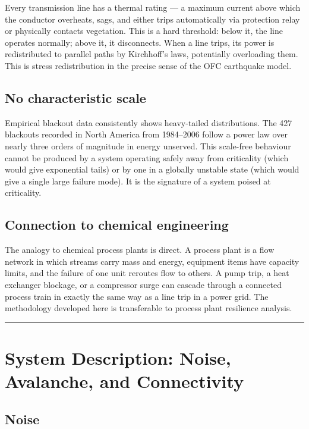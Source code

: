 \documentclass[12pt,a4paper]{article}
\begin{document}
Every transmission line has a thermal rating — a maximum current above
which the conductor overheats, sags, and either trips automatically via
protection relay or physically contacts vegetation. This is a hard
threshold: below it, the line operates normally; above it, it
disconnects. When a line trips, its power is redistributed to parallel
paths by Kirchhoff's laws, potentially overloading them. This is
stress redistribution in the precise sense of the OFC earthquake model.

\subsection{No characteristic scale}

Empirical blackout data consistently shows heavy-tailed distributions.
The 427 blackouts recorded in North America from 1984--2006 follow a
power law over nearly three orders of magnitude in energy unserved.
This scale-free behaviour cannot be produced by a system operating
safely away from criticality (which would give exponential tails) or
by one in a globally unstable state (which would give a single large
failure mode). It is the signature of a system poised at criticality.

\subsection{Connection to chemical engineering}

The analogy to chemical process plants is direct. A process plant is
a flow network in which streams carry mass and energy, equipment items
have capacity limits, and the failure of one unit reroutes flow to
others. A pump trip, a heat exchanger blockage, or a compressor surge
can cascade through a connected process train in exactly the same way
as a line trip in a power grid. The methodology developed here is
transferable to process plant resilience analysis.

\vspace{1em}
\hrule

\section{System Description: Noise, Avalanche, and Connectivity}
\label{sec:model}

\subsection{Noise}
\end{document}
